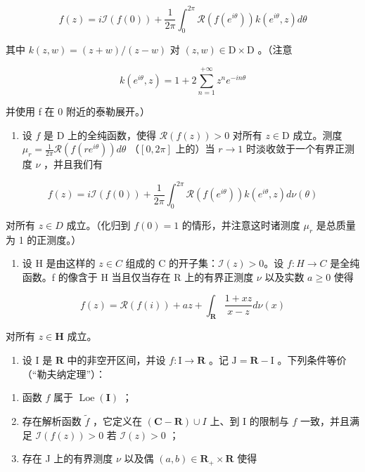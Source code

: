 \[
f (z) = i \mathcal {I} (f (0)) + \frac {1}{2 \pi} \int_ {0} ^ {2 \pi} \mathcal {R} (f (e ^ {i \theta})) k (e ^ {i \theta}, z) d \theta
\]

其中 \(k(z, w) = (z + w) / (z - w)\) 对 \((z, w) \in \mathrm{D} \times \mathrm{D}\) 。（注意

\[
k (e ^ {i \theta}, z) = 1 + 2 \sum_ {n = 1} ^ {+ \infty} z ^ {n} e ^ {- i n \theta}
\]

并使用 f 在 0 附近的泰勒展开。）

\begin{enumerate}
\def\labelenumi{\alph{enumi})}
\setcounter{enumi}{1}
\tightlist
\item
  设 \(f\) 是 D 上的全纯函数，使得 \(\mathcal{R}(f(z)) > 0\) 对所有 \(z \in \mathrm{D}\) 成立。测度 \(\mu_r = \frac{1}{2\pi} \mathcal{R}(f(re^{i\theta})) d\theta\) （\([0, 2\pi]\) 上的）当 \(r \to 1\) 时淡收敛于一个有界正测度 \(\nu\) ，并且我们有
\end{enumerate}

\[
f (z) = i \mathcal {I} (f (0)) + \frac {1}{2 \pi} \int_ {0} ^ {2 \pi} \mathcal {R} (f (e ^ {i \theta})) k (e ^ {i \theta}, z) d \nu (\theta)
\]

对所有 \(z \in D\) 成立。（化归到 \(f(0) = 1\) 的情形，并注意这时诸测度 \(\mu_{r}\) 是总质量为 1 的正测度。）

\begin{enumerate}
\def\labelenumi{\alph{enumi})}
\setcounter{enumi}{2}
\tightlist
\item
  设 H 是由这样的 \(z \in C\) 组成的 C 的开子集：\(\mathcal{I}(z) > 0\)。设 \(f: H \to C\) 是全纯函数。f 的像含于 H 当且仅当存在 R 上的有界正测度 \(\nu\) 以及实数 \(a \geqslant 0\) 使得
\end{enumerate}

\[
f (z) = \mathcal {R} (f (i)) + a z + \int_ {\mathbf {R}} \frac {1 + x z}{x - z} d \nu (x)
\]

对所有 \(z \in \mathbf{H}\) 成立。

\begin{enumerate}
\def\labelenumi{\alph{enumi})}
\setcounter{enumi}{3}
\tightlist
\item
  设 I 是 \(\mathbf{R}\) 中的非空开区间，并设 \(f\colon \mathrm{I}\to \mathbf{R}\) 。记 \(\mathrm{J} = \mathbf{R} - \mathrm{I}\) 。下列条件等价（“勒夫纳定理”）：
\end{enumerate}

\begin{enumerate}
\def\labelenumi{(\roman{enumi})}
\item
  函数 \(f\) 属于 \(\operatorname{Loe}(\mathbf{I})\) ；
\item
  存在解析函数 \(\widetilde{f}\) ，它定义在 \((\mathbf{C} - \mathbf{R}) \cup I\) 上、到 I 的限制与 \(f\) 一致，并且满足 \(\mathcal{I}(f(z)) > 0\) 若 \(\mathcal{I}(z) > 0\) ；
\item
  存在 J 上的有界测度 \(\nu\) 以及偶 \((a,b)\in\mathbf{R}_{+}\times\mathbf{R}\) 使得
\end{enumerate}

